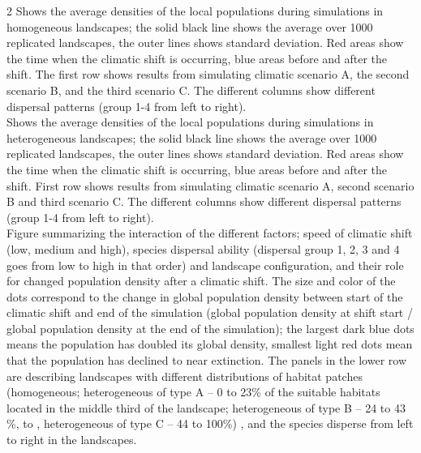 \documentclass[12pt,pdftex]{article}
\begin{document}
\begin{spacing}{2}
 Shows the average densities of the local populations during simulations in homogeneous landscapes; the solid black line shows the average over 1000 replicated landscapes, the outer lines shows standard deviation. Red areas show the time when the climatic shift is occurring, blue areas before and after the shift. The first row shows results from simulating climatic scenario A, the second scenario B, and the third scenario C. The different columns show different dispersal patterns (group 1-4 from left to right).\\

 Shows the average densities of the local populations during simulations in heterogeneous landscapes; the solid black line shows the average over 1000 replicated landscapes, the outer lines shows standard deviation. Red areas show the time when the climatic shift is occurring, blue areas before and after the shift. First row shows results from simulating climatic scenario A, second scenario B and third scenario C. The different columns show different dispersal patterns (group 1-4 from left to right).\\

 Figure summarizing the interaction of the different factors; speed of climatic shift (low, medium and high),  species dispersal ability (dispersal group 1, 2, 3 and 4 goes from low to high in that order) and landscape configuration, and their role for changed population density after a climatic shift. The size and color of the dots correspond to the change in global population density between start of the climatic shift and end of the simulation (global population density at shift start / global population density at the end of the simulation); the largest dark blue dots means the population has doubled its global density, smallest light red dots mean that the population has declined to near extinction. The panels in the lower row are describing landscapes with different distributions of habitat patches (homogeneous; heterogeneous of type A -- 0 to 23\% of the suitable habitats located in the middle third of the landscape; heterogeneous of type B -- 24 to 43 \%,  to , heterogeneous of type C --  44 to 100\%) , and the species disperse from left to right in the landscapes.\\ 


\end{spacing}
\end{document}
